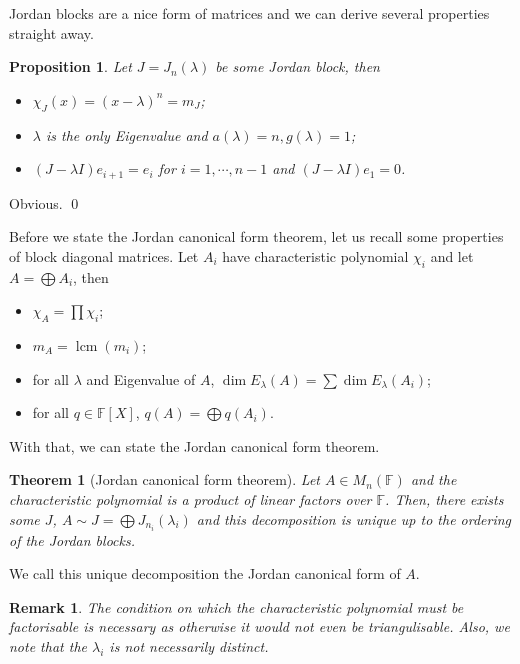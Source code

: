 \documentclass[
]{article}
\newtheorem{theorem}{Theorem}
\newtheorem{prop}{Proposition}[section]
\newtheorem*{remark}{Remark}
\theoremstyle{definition}
\begin{document}
Jordan blocks are a nice form of matrices and we can derive several
properties straight away.

\begin{prop}
  Let \(J = J_n(\lambda)\) be some Jordan block, then 
  \begin{itemize}
    \item \(\chi_J(x) = (x - \lambda)^n = m_J\);
    \item \(\lambda\) is the only Eigenvalue and \(a(\lambda) = n, g(\lambda) = 1\);
    \item \((J - \lambda I)e_{i + 1} = e_i\) for \(i = 1, \cdots, n - 1\) 
      and \((J - \lambda I)e_1 = 0\).
  \end{itemize}
\end{prop}
\proof

Obvious. \qed

Before we state the Jordan canonical form theorem, let us recall some
properties of block diagonal matrices. Let \(A_i\) have characteristic
polynomial \(\chi_i\) and let \(A = \bigoplus A_i\), then

\begin{itemize}
  \item \(\chi_A = \prod \chi_i\);
  \item \(m_A = \mathop{\mathrm{lcm}}(m_i)\);
  \item for all \(\lambda\) and Eigenvalue of \(A\), 
    \(\dim E_\lambda(A) = \sum \dim E_\lambda(A_i)\);
  \item for all \(q \in \mathbb{F}[X]\), \(q(A) = \bigoplus q(A_i)\).
\end{itemize}

With that, we can state the Jordan canonical form theorem.

\begin{theorem}[Jordan canonical form theorem]
  Let \(A \in M_n(\mathbb{F})\) and the characteristic polynomial is a product 
  of linear factors over \(\mathbb{F}\). Then, 
  there exists some \(J\), \(A \sim J = \bigoplus J_{n_i}(\lambda_i)\) and 
  this decomposition is unique up to the ordering of the Jordan blocks.
\end{theorem}

We call this unique decomposition the Jordan canonical form of \(A\).

\begin{remark}
  The condition on which the characteristic polynomial must be factorisable is 
  necessary as otherwise it would not even be triangulisable. Also, we note that 
  the \(\lambda_i\) is not necessarily distinct.
\end{remark}
\end{document}
